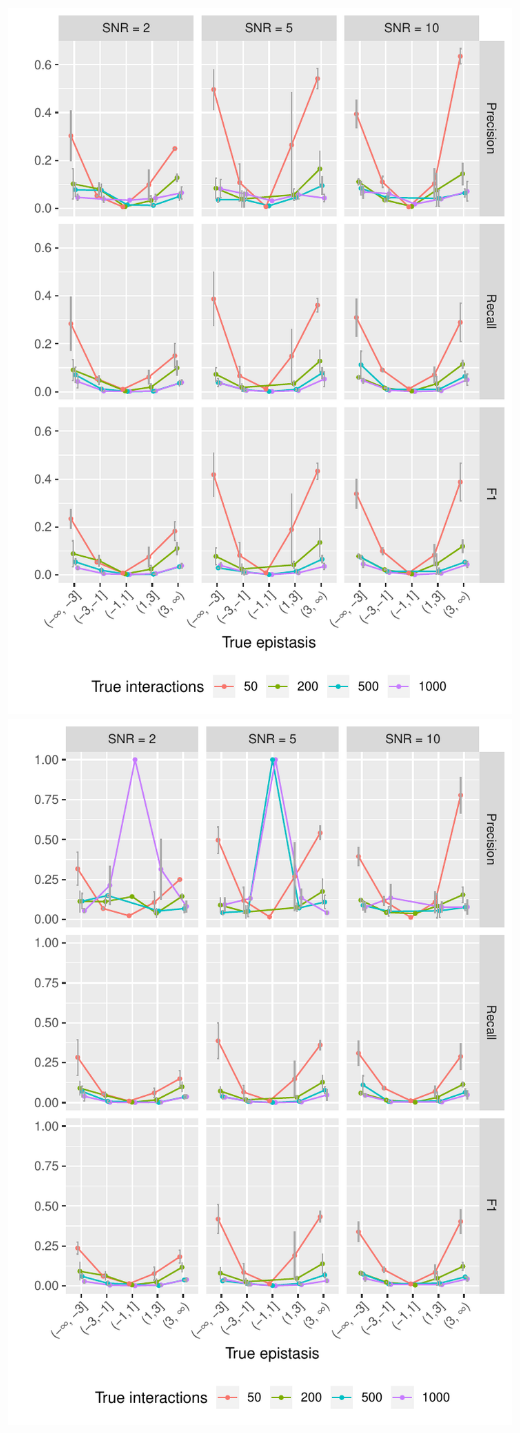 \begin{minipage}{\linewidth}
	\centering
	\includegraphics[width=0.5\linewidth]{"output/FXstrength_PRF_n10000_tno_mult10_"}%
	\includegraphics[width=0.5\linewidth]{"output/FXstrength_PRF_n10000_tyes_mult10_"}
\end{minipage}

